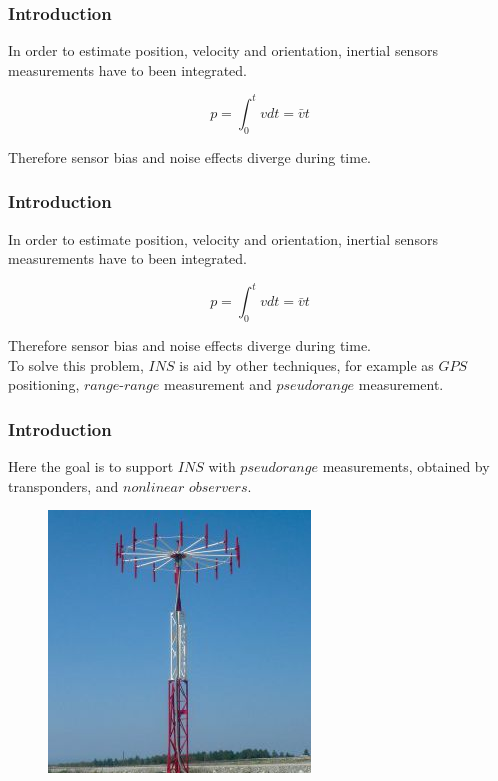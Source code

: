 \documentclass{beamer}
\begin{document}
	\begin{frame}
		\frametitle{Introduction}
		In order to estimate position, velocity and orientation, inertial sensors measurements have to been integrated.
		
		\[ p =  \int_0^t{v dt} = \bar{v}t \]
		
		Therefore sensor bias and noise effects diverge during time.
	\end{frame}
	
	
	
	\begin{frame}
		\frametitle{Introduction}
		In order to estimate position, velocity and orientation, inertial sensors measurements have to been integrated.
		
		\[ p =  \int_0^t{v dt} = \bar{v}t \]
		
		Therefore sensor bias and noise effects diverge during time.\\
		\vspace{0.2cm}
		To solve this problem, $INS$ is aid by other techniques, for example as $GPS$ positioning, $range$-$range$ measurement and $pseudorange$ measurement.
	\end{frame}
	
	
	

	\begin{frame}
		\frametitle{Introduction}
		Here the goal is to support $INS$ with $pseudorange$ measurements, obtained by transponders, and $nonlinear$ $observers$. 
		
		\begin{figure}[H]
			\includegraphics[scale=0.4]{transp}
		\end{figure}
	\end{frame}
\end{document}
